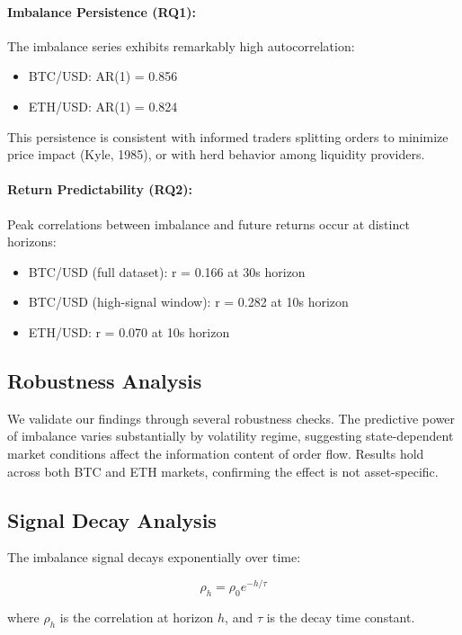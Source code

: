\documentclass[12pt,a4paper]{article}
\begin{document}
\paragraph{Imbalance Persistence (RQ1):}
The imbalance series exhibits remarkably high autocorrelation:
\begin{itemize}
    \item BTC/USD: AR(1) = 0.856
    \item ETH/USD: AR(1) = 0.824
\end{itemize}

This persistence is consistent with informed traders splitting orders to minimize price impact (Kyle, 1985), or with herd behavior among liquidity providers.

\paragraph{Return Predictability (RQ2):}
Peak correlations between imbalance and future returns occur at distinct horizons:
\begin{itemize}
    \item BTC/USD (full dataset): r = 0.166 at 30s horizon
    \item BTC/USD (high-signal window): r = 0.282 at 10s horizon
    \item ETH/USD: r = 0.070 at 10s horizon
\end{itemize}

\subsection{Robustness Analysis}

We validate our findings through several robustness checks. The predictive power of imbalance varies substantially by volatility regime, suggesting state-dependent market conditions affect the information content of order flow. Results hold across both BTC and ETH markets, confirming the effect is not asset-specific.

\subsection{Signal Decay Analysis}

The imbalance signal decays exponentially over time:

\begin{equation}
\rho_h = \rho_0 e^{-h / \tau}
\end{equation}

where $\rho_h$ is the correlation at horizon $h$, and $\tau$ is the decay time constant.
\end{document}
